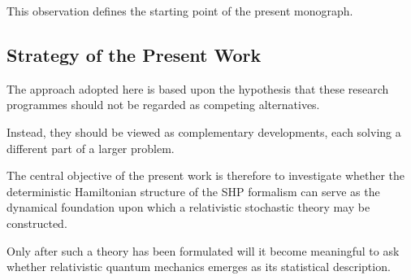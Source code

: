 This observation defines the starting point of the present monograph.

\subsection{Strategy of the Present Work}

The approach adopted here is based upon the hypothesis that these
research programmes should not be regarded as competing alternatives.

Instead, they should be viewed as complementary developments, each
solving a different part of a larger problem.

The central objective of the present work is therefore to investigate
whether the deterministic Hamiltonian structure of the SHP formalism can
serve as the dynamical foundation upon which a relativistic stochastic
theory may be constructed.

Only after such a theory has been formulated will it become meaningful
to ask whether relativistic quantum mechanics emerges as its statistical
description.












